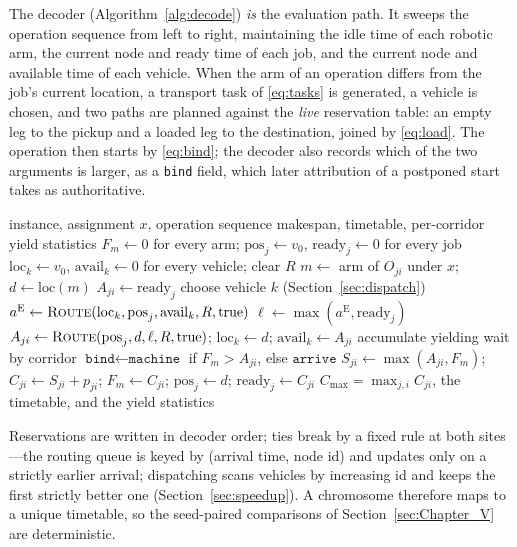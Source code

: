 The decoder (Algorithm~\ref{alg:decode}) \emph{is} the evaluation path.
It sweeps the operation sequence from left to right, maintaining the idle time of each robotic arm, the current node and ready time of each job, and the current node and available time of each vehicle.
When the arm of an operation differs from the job's current location, a transport task of \eqref{eq:tasks} is generated, a vehicle is chosen, and two paths are planned against the \emph{live} reservation table: an empty leg to the pickup and a loaded leg to the destination, joined by \eqref{eq:load}.
The operation then starts by \eqref{eq:bind}; the decoder also records which of the two arguments is larger, as a \texttt{bind} field, which later attribution of a postponed start takes as authoritative.

\begin{algorithm}[t]
\caption{\textsc{Decode}: fitness from a complete conflict-free simulation}
\label{alg:decode}
\footnotesize
\begin{algorithmic}[1]
\Require instance, assignment $x$, operation sequence
\Ensure makespan, timetable, per-corridor yield statistics
\State $F_m\gets 0$ for every arm; $\mathrm{pos}_j\gets v_0$, $\mathrm{ready}_j\gets 0$ for every job
\State $\mathrm{loc}_k\gets v_0$, $\mathrm{avail}_k\gets 0$ for every vehicle; clear $R$
  \State $m\gets$ arm of $O_{ji}$ under $x$; $d\gets \mathrm{loc}(m)$
     \State $A_{ji}\gets \mathrm{ready}_j$
  \Else
     \State choose vehicle $k$ (Section~\ref{sec:dispatch})
     \State $a^{\mathrm{E}}\gets\textsc{Route}(\mathrm{loc}_k,\mathrm{pos}_j,\mathrm{avail}_k,R,\text{true})$
     \State $\ell\gets\max(a^{\mathrm{E}},\mathrm{ready}_j)$
     \State $A_{ji}\gets\textsc{Route}(\mathrm{pos}_j,d,\ell,R,\text{true})$; $\mathrm{loc}_k\gets d$; $\mathrm{avail}_k\gets A_{ji}$
     \State accumulate yielding wait by corridor
  \EndIf
  \State $\texttt{bind}\gets\texttt{machine}$ if $F_m>A_{ji}$, else $\texttt{arrive}$
  \State $S_{ji}\gets\max(A_{ji},F_m)$; $C_{ji}\gets S_{ji}+p_{ji}$; $F_m\gets C_{ji}$; $\mathrm{pos}_j\gets d$; $\mathrm{ready}_j\gets C_{ji}$
\EndFor
\State \Return $C_{\max}=\max_{j,i} C_{ji}$, the timetable, and the yield statistics
\end{algorithmic}
\end{algorithm}

Reservations are written in decoder order; ties break by a fixed rule at both sites---the routing queue is keyed by (arrival time, node id) and updates only on a strictly earlier arrival; dispatching scans vehicles by increasing id and keeps the first strictly better one (Section~\ref{sec:speedup}).
A chromosome therefore maps to a unique timetable, so the seed-paired comparisons of Section~\ref{sec:Chapter_V} are deterministic.

